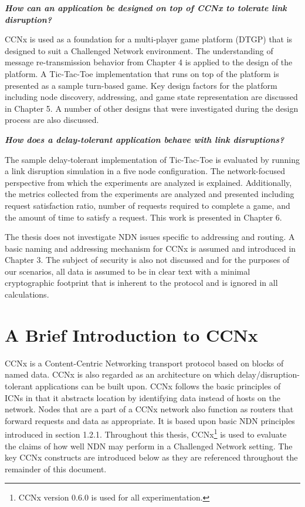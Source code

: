 \documentclass[a4paper,12pt]{report}      %
\begin{document}
\vspace{1em}
\noindent\textsl{\textbf{How can an application be designed on top of CCNx to tolerate link disruption?}} \par
CCNx is used as a foundation for a multi-player game platform (DTGP) that is designed to suit a Challenged Network environment. 
The understanding of message re-transmission behavior from Chapter 4 is applied to the design of the platform. A Tic-Tac-Toe implementation 
that runs on top of the platform is presented as a sample turn-based game. Key design factors for the platform including
node discovery, addressing, and game state representation are discussed in Chapter 5. A number of other designs that were investigated during the design process are also discussed.

\vspace{1em}
\noindent\textsl{\textbf{How does a delay-tolerant application behave with link disruptions?}} \par
The sample delay-tolerant implementation of Tic-Tac-Toe is evaluated by running a link disruption simulation 
in a five node configuration. The network-focused perspective from which the experiments are analyzed is explained.
Additionally, the metrics collected from the experiments are analyzed and presented including request satisfaction ratio, 
number of requests required to complete a game, and the amount of time to satisfy a request. This work is presented in Chapter 6.

The thesis does not investigate NDN issues specific to addressing and routing. A basic naming and
addressing mechanism for CCNx is assumed and introduced in Chapter 3. The subject of security is
also not discussed and for the purposes of our scenarios, all data is assumed to be in clear text with a
minimal cryptographic footprint that is inherent to the protocol and is ignored in all calculations.

\pagebreak
\chapter{A Brief Introduction to CCNx}
CCNx is a Content-Centric Networking transport protocol based on blocks of named data\cite{CCNxproto}. CCNx is also regarded as an architecture on which delay/disruption-tolerant applications can be built upon. CCNx follows the basic principles of ICNs in that it abstracts location by identifying data instead of hosts on the network. Nodes that are a part of a CCNx network also function as routers that forward requests and data as appropriate. It is based upon basic NDN principles introduced in section 1.2.1. Throughout this thesis, CCNx\footnote{CCNx version 0.6.0 is used for all experimentation.} is used to evaluate the claims of how well NDN may perform in a Challenged Network setting. The key CCNx constructs are introduced below as they are referenced throughout the remainder of this document\cite{CCNxproto}.
\end{document}
